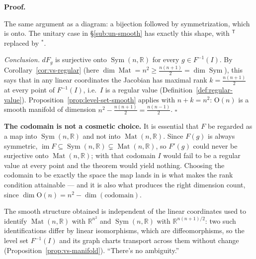 \documentclass[11pt]{report}
\renewenvironment{proof}[1][Proof]{\noindent\textbf{#1.} }{\hfill$\square$\par\vspace{5pt}}
\newcommand{\Ogp}{\mathrm{O}}
\DeclareMathOperator{\Mat}{Mat}
\DeclareMathOperator{\Sym}{Sym}
\begin{document}
\begin{proof}
\begin{center}
\end{center}

The same argument as a diagram: a bijection followed by symmetrization, which is onto. The unitary case in \S\ref{sub:un-smooth} has exactly this shape, with $^{\mathsf T}$ replaced by $^*$.

\emph{Conclusion.} $dF_g$ is surjective onto $\Sym(n,\mathbb{R})$ for every $g \in F^{-1}(I)$. By Corollary~\ref{cor:vs-regular} (here $\dim \Mat = n^2 \ge \tfrac{n(n+1)}{2} = \dim \Sym$), this says that in any linear coordinates the Jacobian has maximal rank $k = \tfrac{n(n+1)}{2}$ at every point of $F^{-1}(I)$, i.e.\ $I$ is a regular value (Definition~\ref{def:regular-value}). Proposition~\ref{prop:level-set-smooth} applies with $n + k = n^2$: $\Ogp(n)$ is a smooth manifold of dimension $n^2 - \tfrac{n(n+1)}{2} = \tfrac{n(n-1)}{2}$.
\end{proof}

\begin{rembox}\label{rem:vector-spaces-5}
\textbf{The codomain is not a cosmetic choice.} It is essential that $F$ be regarded as a map into $\Sym(n,\mathbb{R})$ and not into $\Mat(n,\mathbb{R})$. Since $F(g)$ is always symmetric, $\operatorname{im} F \subseteq \Sym(n,\mathbb{R}) \subsetneq \Mat(n,\mathbb{R})$, so $F'(g)$ could never be surjective onto $\Mat(n,\mathbb{R})$; with that codomain $I$ would fail to be a regular value at every point and the theorem would yield nothing. Choosing the codomain to be exactly the space the map lands in is what makes the rank condition attainable --- and it is also what produces the right dimension count, since $\dim \Ogp(n) = n^2 - \dim(\text{codomain})$.
\end{rembox}

\begin{rembox}\label{rem:vector-spaces-6}
The smooth structure obtained is independent of the linear coordinates used to identify $\Mat(n,\mathbb{R})$ with $\mathbb{R}^{n^2}$ and $\Sym(n,\mathbb{R})$ with $\mathbb{R}^{n(n+1)/2}$: two such identifications differ by linear isomorphisms, which are diffeomorphisms, so the level set $F^{-1}(I)$ and its graph charts transport across them without change (Proposition~\ref{prop:vs-manifold}). ``There's no ambiguity.''
\end{rembox}
\end{document}
